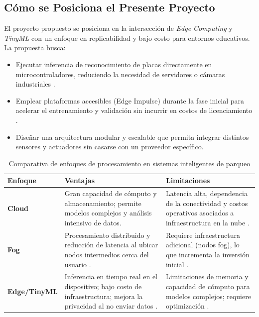 \documentclass[12pt, letterpaper]{article}
\begin{document}
\subsection{Cómo se Posiciona el Presente Proyecto}
El proyecto propuesto se posiciona en la intersección de \textit{Edge Computing} y \textit{TinyML} con un enfoque en replicabilidad y bajo costo para entornos educativos. La propuesta busca:
\begin{itemize}
    \item Ejecutar inferencia de reconocimiento de placas directamente en microcontroladores, reduciendo la necesidad de servidores o cámaras industriales \parencite{warden2020tinyml, zheng2025iot}.
    \item Emplear plataformas accesibles (Edge Impulse) durante la fase inicial para acelerar el entrenamiento y validación sin incurrir en costos de licenciamiento \parencite{edgeimpulseDocs, tinyml2022EdgeImpulse}.
    \item Diseñar una arquitectura modular y escalable que permita integrar distintos sensores y actuadores sin casarse con un proveedor específico.
\end{itemize}

\begin{table}[H]
\centering
\caption{Comparativa de enfoques de procesamiento en sistemas inteligentes de parqueo}
\label{tab:comparativa}
\renewcommand{\arraystretch}{1.5} %
\begin{tabularx}{\columnwidth}{>{\raggedright\arraybackslash\bfseries}p{} X X}
\toprule
Enfoque & Ventajas & Limitaciones \\
\midrule
Cloud & Gran capacidad de cómputo y almacenamiento; permite modelos complejos y análisis intensivo de datos. & Latencia alta, dependencia de la conectividad y costos operativos asociados a infraestructura en la nube \parencite{bonomi2012fog}. \\
Fog & Procesamiento distribuido y reducción de latencia al ubicar nodos intermedios cerca del usuario \parencite{celaya2020fog}. & Requiere infraestructura adicional (nodos fog), lo que incrementa la inversión inicial \parencite{celaya2020fog}. \\
Edge/TinyML & Inferencia en tiempo real en el dispositivo; bajo costo de infraestructura; mejora la privacidad al no enviar datos \parencite{zheng2025iot, warden2020tinyml}. & Limitaciones de memoria y capacidad de cómputo para modelos complejos; requiere optimización \parencite{zheng2025iot}. \\
\bottomrule
\end{tabularx}
\end{table}
\end{document}
